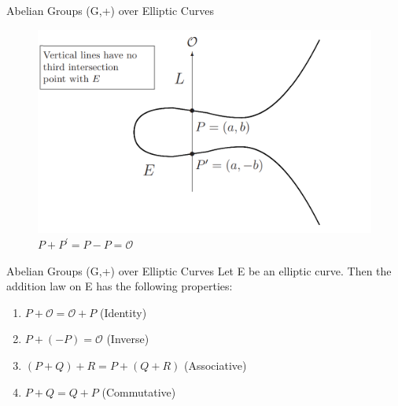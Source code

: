\documentclass[handout]{beamer}
\begin{document}
\begin{frame}{Abelian Groups (G,+) over Elliptic Curves}
\begin{figure}

		\centering
		\includegraphics[width=1\linewidth]{P-P}
		\caption{$P+P^{\prime}=P-P=\mathcal{O}$}\label{fig:p-p}


\end{figure}
\end{frame}
\begin{frame}{Abelian Groups (G,+) over Elliptic Curves}
	Let E be an elliptic curve. Then the addition law on E has the following properties:
	\begin{enumerate}[1.]
		\item $P + \mathcal{O} = \mathcal{O} + P$ (Identity)\pause
		\item $P + (-P) = \mathcal{O}$ (Inverse)\pause
		\item $(P + Q) + R = P + (Q + R) $ (Associative)\pause
		\item $P + Q = Q + P$ (Commutative)
	\end{enumerate}

\end{frame}

%
%
\end{document}
